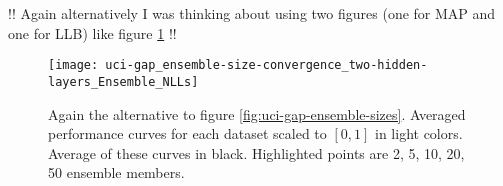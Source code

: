 \documentclass[../thesis.tex]{subfiles}
\begin{document}
!! Again alternatively I was thinking about using two figures (one for MAP and one for LLB) like figure \ref{fig:uci-gap-ensemble-sizes-alternative} !!

\begin{figure}
    \centering
    \texttt{[image: uci-gap\_ensemble-size-convergence\_two-hidden-layers\_Ensemble\_NLLs]} 
    \caption{Again the alternative to figure \ref{fig:uci-gap-ensemble-sizes}. Averaged performance curves for each dataset scaled to $[0, 1]$ in light colors. Average of these curves in black. Highlighted points are 2, 5, 10, 20, 50 ensemble members.}
    \label{fig:uci-gap-ensemble-sizes-alternative}
\end{figure}
\end{document}

